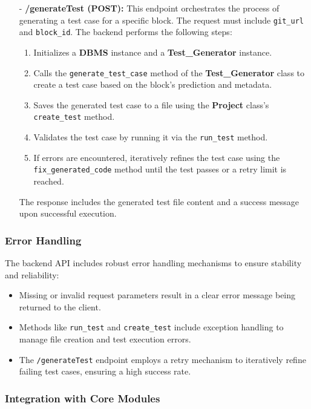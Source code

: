 \begin{itemize}
    \item[-] \textbf{/generateTest (POST):} 
    This endpoint orchestrates the process of generating a test case for a specific block. The request must include \texttt{git\_url} and \texttt{block\_id}. The backend performs the following steps:
    \begin{enumerate}
        \item Initializes a \textbf{DBMS} instance and a \textbf{Test\_Generator} instance.
        \item Calls the \texttt{generate\_test\_case} method of the \textbf{Test\_Generator} class to create a test case based on the block's prediction and metadata.
        \item Saves the generated test case to a file using the \textbf{Project} class's \texttt{create\_test} method.
        \item Validates the test case by running it via the \texttt{run\_test} method.
        \item If errors are encountered, iteratively refines the test case using the \texttt{fix\_generated\_code} method until the test passes or a retry limit is reached.
    \end{enumerate}
    The response includes the generated test file content and a success message upon successful execution.

\end{itemize}

\subsubsection{Error Handling}

The backend API includes robust error handling mechanisms to ensure stability and reliability:
\begin{itemize}
    \item Missing or invalid request parameters result in a clear error message being returned to the client.
    \item Methods like \texttt{run\_test} and \texttt{create\_test} include exception handling to manage file creation and test execution errors.
    \item The \texttt{/generateTest} endpoint employs a retry mechanism to iteratively refine failing test cases, ensuring a high success rate.
\end{itemize}

\subsubsection{Integration with Core Modules}


